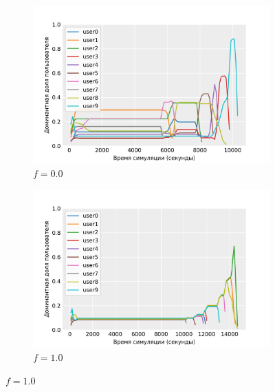 \begin{figure}[h!]
    \centering 
    \begin{subfigure}{0.49\linewidth}
        \centering
        \includegraphics[width=\linewidth]{images/fair_share_0}
        \caption{$f = 0.0$}
        \label{fig:fair_share_0}
    \end{subfigure}
    \begin{subfigure}{0.49\linewidth}
        \centering
        \includegraphics[width=\linewidth]{images/fair_share_1}
        \caption{$f = 1.0$}
        \label{fig:fair_share_1}
    \end{subfigure}


\end{figure}
